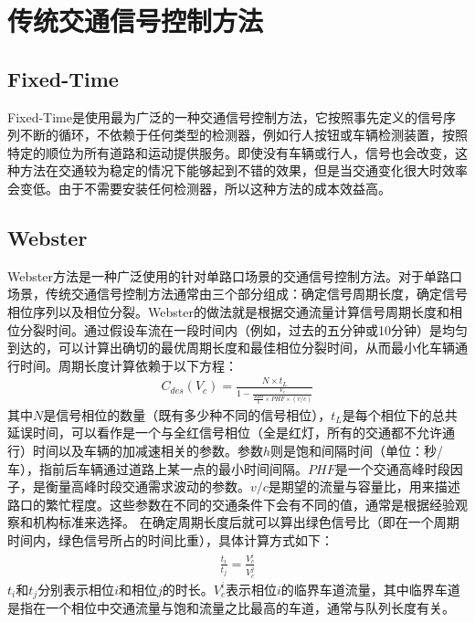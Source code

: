 \section{传统交通信号控制方法}
\subsection{Fixed-Time}
Fixed-Time\cite{miller1963settings}是使用最为广泛的一种交通信号控制方法，它按照事先定义的信号序列不断的循环，不依赖于任何类型的检测器，例如行人按钮或车辆检测装置，按照特定的顺位为所有道路和运动提供服务。即使没有车辆或行人，信号也会改变，这种方法在交通较为稳定的情况下能够起到不错的效果，但是当交通变化很大时效率会变低。由于不需要安装任何检测器，所以这种方法的成本效益高。

\subsection{Webster}
Webster\cite{koonce2008traffic}方法是一种广泛使用的针对单路口场景的交通信号控制方法。对于单路口场景，传统交通信号控制方法通常由三个部分组成：确定信号周期长度，确定信号相位序列以及相位分裂。Webster的做法就是根据交通流量计算信号周期长度和相位分裂时间。通过假设车流在一段时间内（例如，过去的五分钟或10分钟）是均匀到达的，可以计算出确切的最优周期长度和最佳相位分裂时间，从而最小化车辆通行时间。周期长度计算依赖于以下方程：
\begin{align}
    C_{d e s}\left(V_{c}\right)=\frac{N \times t_{L}}{1-\frac{V_{c}}{\frac{3600}{h} \times P H F \times(v / c)}}
\end{align}
其中$N$是信号相位的数量（既有多少种不同的信号相位），$t_{L}$是每个相位下的总共延误时间，可以看作是一个与全红信号相位（全是红灯，所有的交通都不允许通行）时间以及车辆的加减速相关的参数。参数$h$则是饱和间隔时间（单位：秒/车），指前后车辆通过道路上某一点的最小时间间隔。$PHF$是一个交通高峰时段因子，是衡量高峰时段交通需求波动的参数。$v / c$是期望的流量与容量比，用来描述路口的繁忙程度。这些参数在不同的交通条件下会有不同的值，通常是根据经验观察和机构标准来选择。
在确定周期长度后就可以算出绿色信号比（即在一个周期时间内，绿色信号所占的时间比重），具体计算方式如下：
\begin{align}
    \frac{t_{i}}{t_{j}}=\frac{V_{c}^{i}}{V_{c}^{j}}
\end{align}
$t_i \text{和} t_j$分别表示相位$i$和相位$j$的时长。$V_c^i$表示相位$i$的临界车道流量，其中临界车道是指在一个相位中交通流量与饱和流量之比最高的车道，通常与队列长度有关。

